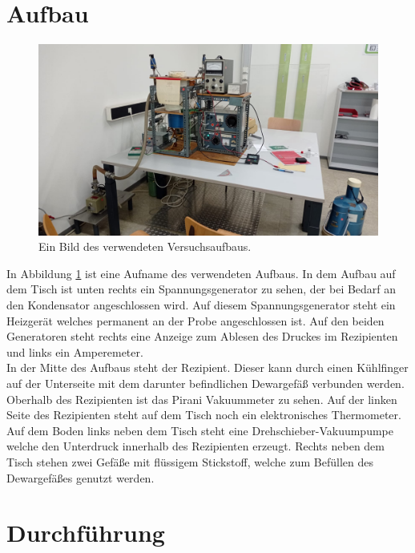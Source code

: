 \newpage
\section{Aufbau}
	\begin{figure}
        \centering
        \includegraphics[width = \textwidth]{latex/images/Aufbau.jpeg}
        \caption{Ein Bild des verwendeten Versuchsaufbaus.}
        \label{fig:Aufb}
    \end{figure}
    \noindent
    In Abbildung \ref{fig:Aufb} ist  eine Aufname des verwendeten Aufbaus. 
    In dem Aufbau auf dem Tisch ist unten rechts ein Spannungsgenerator zu sehen, der bei Bedarf an den Kondensator angeschlossen wird.
    Auf diesem Spannungsgenerator steht ein Heizgerät welches permanent an der Probe angeschlossen ist.
    Auf den beiden Generatoren steht rechts eine Anzeige zum Ablesen des Druckes im Rezipienten und links ein Amperemeter.\\
    In der Mitte des Aufbaus steht der Rezipient. Dieser kann durch einen Kühlfinger auf der Unterseite mit dem darunter befindlichen Dewargefäß verbunden werden.
    Oberhalb des Rezipienten ist das Pirani Vakuummeter zu sehen.
    Auf der linken Seite des Rezipienten steht auf dem Tisch noch ein elektronisches Thermometer.
    Auf dem Boden links neben dem Tisch steht eine Drehschieber-Vakuumpumpe welche den Unterdruck innerhalb des Rezipienten erzeugt.
    Rechts neben dem Tisch stehen zwei Gefäße mit flüssigem Stickstoff, welche zum Befüllen des Dewargefäßes genutzt werden.
     
\section{Durchführung}

